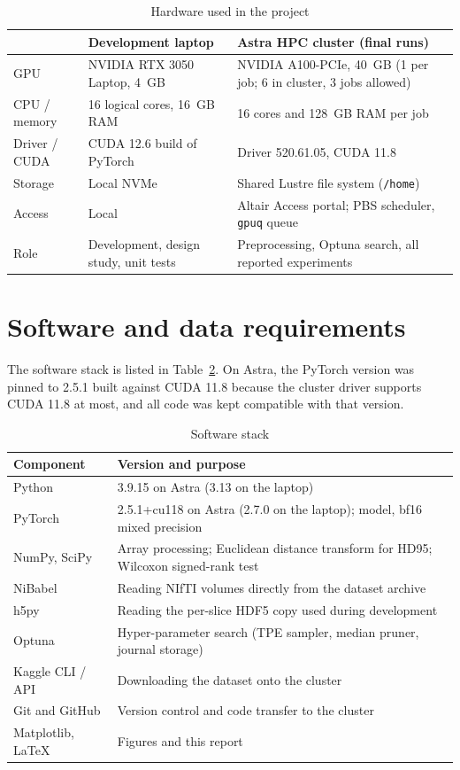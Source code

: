 \begin{table}[htbp]\centering\small
\caption{Hardware used in the project}\label{tab:hardware}
\begin{tabular}{p{3.1cm}p{5.3cm}p{5.3cm}}\toprule
 & \textbf{Development laptop} & \textbf{Astra HPC cluster (final runs)}\\\midrule
GPU & NVIDIA RTX 3050 Laptop, 4~GB & NVIDIA A100-PCIe, 40~GB (1 per job; 6 in cluster, 3 jobs allowed)\\
CPU / memory & 16 logical cores, 16~GB RAM & 16 cores and 128~GB RAM per job\\
Driver / CUDA & CUDA 12.6 build of PyTorch & Driver 520.61.05, CUDA 11.8\\
Storage & Local NVMe & Shared Lustre file system (\texttt{/home})\\
Access & Local & Altair Access portal; PBS scheduler, \texttt{gpuq} queue\\
Role & Development, design study, unit tests & Preprocessing, Optuna search, all reported experiments\\\bottomrule
\end{tabular}
\end{table}

\section{Software and data requirements}
The software stack is listed in Table~\ref{tab:software}. On Astra, the PyTorch version was pinned to 2.5.1 built against CUDA 11.8 because the cluster driver supports CUDA 11.8 at most, and all code was kept compatible with that version.

\begin{table}[htbp]\centering\small
\caption{Software stack}\label{tab:software}
\begin{tabular}{p{3.6cm}p{10.4cm}}\toprule
\textbf{Component} & \textbf{Version and purpose}\\\midrule
Python & 3.9.15 on Astra (3.13 on the laptop)\\
PyTorch & 2.5.1+cu118 on Astra (2.7.0 on the laptop); model, bf16 mixed precision\\
NumPy, SciPy & Array processing; Euclidean distance transform for HD95; Wilcoxon signed-rank test\\
NiBabel & Reading NIfTI volumes directly from the dataset archive\\
h5py & Reading the per-slice HDF5 copy used during development\\
Optuna & Hyper-parameter search (TPE sampler, median pruner, journal storage)\\
Kaggle CLI / API & Downloading the dataset onto the cluster\\
Git and GitHub & Version control and code transfer to the cluster\\
Matplotlib, \LaTeX & Figures and this report\\\bottomrule
\end{tabular}
\end{table}

